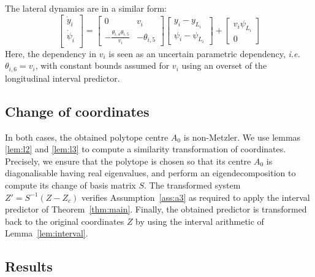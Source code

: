 \documentclass[twocolumn,english]{IEEEtran}
\theoremstyle{plain}
\theoremstyle{definition}
\theoremstyle{plain}
\theoremstyle{plain}
\theoremstyle{remark}
\begin{document}
The lateral dynamics are in a similar form:
\begin{equation*}
\begin{bmatrix}
\dot{y}_i \\
\dot{\psi}_i \\
\end{bmatrix}
=
\begin{bmatrix}
0 & v_i \\
-\frac{\theta_{i,4} \theta_{i,5}}{v_i} & -\theta_{i,5}
\end{bmatrix}
\begin{bmatrix}
y_i - y_{L_i} \\
\psi_i - \psi_{L_i}
\end{bmatrix}
+
\begin{bmatrix}
v_i\psi_{L_i} \\
0
\end{bmatrix}
\end{equation*}
Here, the dependency in $v_i$ is seen as an uncertain parametric dependency, \emph{i.e.} $\theta_{i,6}=v_i$, with constant bounds assumed for $v_i$ using an overset of the longitudinal interval predictor.

\subsection{Change of coordinates}
In both cases, the obtained polytope centre $A_0$ is non-Metzler.
We use lemmas \ref{lem:l2} and \ref{lem:l3} to compute a similarity transformation of coordinates. Precisely, we ensure that the polytope is chosen so that its centre $A_0$ is diagonalisable having real eigenvalues, and perform an eigendecomposition to compute its change of basis matrix $S$. The transformed system $Z'=S^{-1}(Z-Z_c)$ verifies Assumption~\ref{ass:a3} as required to apply the interval predictor of Theorem~\ref{thm:main}. Finally, the obtained predictor is transformed back to the original coordinates $Z$ by using the interval arithmetic of Lemma~\ref{lem:interval}.

\subsection{Results}
\end{document}
